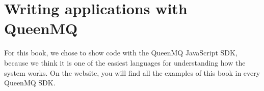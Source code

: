 
\chapter{Writing applications with QueenMQ}

For this book, we chose to show code with the QueenMQ JavaScript SDK, because we think it is one of the easiest languages for understanding how the system works. On the website, you will find all the examples of this book in every QueenMQ SDK.













